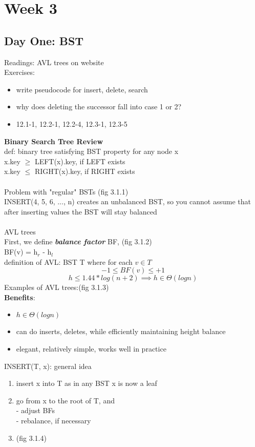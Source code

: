 \documentclass{article}
\begin{document}
	\section{Week 3}
		\subsection{Day One: BST\\}
		Readings: AVL trees on website\\
		Exercises:
		\begin{itemize}
			\item write pseudocode for insert, delete, search
			\item why does deleting the successor fall into case 1 or 2?
			\item 12.1-1, 12.2-1, 12.2-4, 12.3-1, 12.3-5\\
		\end{itemize}
		\textbf{Binary Search Tree Review}\\
			def: binary tree satisfying BST property for any node x\\
			x.key $\ge$ LEFT(x).key, if LEFT exists\\
			x.key $\le$ RIGHT(x).key, if RIGHT exists\\\\
			Problem with "regular" BSTs (fig 3.1.1)\\
			INSERT(4, 5, 6, ..., n) creates an unbalanced BST, so you cannot assume that after inserting values the BST will stay balanced\\\\
			AVL trees\\
			First, we define \textbf{\emph{balance factor}} BF, (fig 3.1.2)\\
			BF(v) = h$_r$ - h$_l$\\
			definition of AVL: BST T where for each $v\in T$
			$$- 1\le BF(v)\le + 1$$
			$$h\le 1.44*log(n+2) \implies h\in\Theta(log n)$$
			Examples of AVL trees:(fig 3.1.3)\\
			\textbf{Benefits}:
			\begin{itemize}
				\item $h\in\Theta(log n)$
				\item can do inserts, deletes, while efficiently maintaining height balance
				\item elegant, relatively simple, works well in practice
			\end{itemize}
			INSERT(T, x): general idea
			\begin{enumerate}
				\item insert x into T as in any BST x is now a leaf
				\item go from x to the root of T, and\\
					- adjust BFs\\
					- rebalance, if necessary
				\item (fig 3.1.4)
			\end{enumerate}
\end{document}
